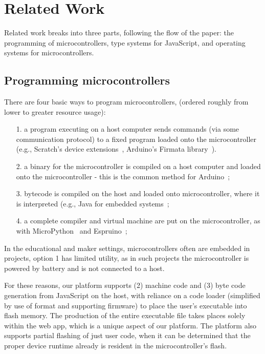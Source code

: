 \section{Related Work}
\label{sec:related}

Related work breaks into three parts, following the
flow of the paper: the programming of microcontrollers,
type systems for JavaScript, and operating systems
for microcontrollers.

\subsection{Programming microcontrollers}

There are four basic ways to program microcontrollers,
(ordered roughly from lower to greater resource usage):
\begin{itemize}
\item[1.] a program executing on a host computer sends commands (via some communication protocol) 
to a fixed program loaded onto the microcontroller (e.g., Scratch's
device extensions~\cite{ScratchCACM2009}, Arduino's Firmata library~\cite{Firmata}).
\item[2.] a binary for the microcontroller is compiled on a host computer and loaded onto the microcontroller -
this is the common method for Arduino~\cite{buildingArduino2014};
\item[3.] bytecode is compiled on the host and loaded onto microcontroller, where it is interpreted
(e.g., Java for embedded systems~\cite{ClausenTOPLAS};
\item[4.] a complete compiler and virtual machine are put on the microcontroller, 
as with MicroPython~\cite{MicroPython} and Espruino~\cite{espruinoBook};
\end{itemize}

In the educational and maker settings, microcontrollers often are embedded in projects,
option 1 has limited utility, as in such projects the microcontroller is powered by battery and
is not connected to a host.

For these reasons, our platform supports (2) machine code and (3) byte code generation 
from JavaScript on the host, with reliance on a code loader (simplified
by use of \UF format and supporting firmware) to place the user's executable 
into flash memory.  The production of the entire executable file
takes places solely within the web app, which is a unique aspect of our platform.
The platform also supports partial flashing of just user code, 
when it can be determined that the proper device runtime already 
is resident in the microcontroller's flash.

